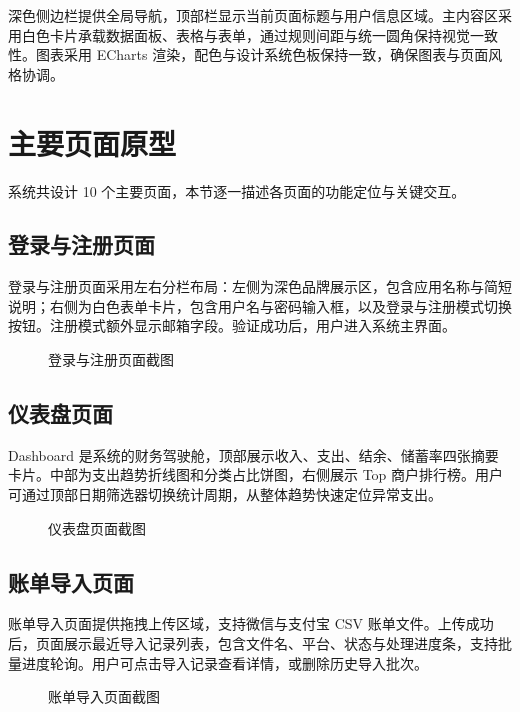 深色侧边栏提供全局导航，顶部栏显示当前页面标题与用户信息区域。主内容区采用白色卡片承载数据面板、表格与表单，通过规则间距与统一圆角保持视觉一致性。图表采用 ECharts 渲染，配色与设计系统色板保持一致，确保图表与页面风格协调。

\section{主要页面原型}

系统共设计 10 个主要页面，本节逐一描述各页面的功能定位与关键交互。

\subsection{登录与注册页面}

登录与注册页面采用左右分栏布局：左侧为深色品牌展示区，包含应用名称与简短说明；右侧为白色表单卡片，包含用户名与密码输入框，以及登录与注册模式切换按钮。注册模式额外显示邮箱字段。验证成功后，用户进入系统主界面。

\begin{figure}[H]
  \centering
  \caption{登录与注册页面截图}
  \label{fig:screenshot-login}
\end{figure}

\subsection{仪表盘页面}

Dashboard 是系统的财务驾驶舱，顶部展示收入、支出、结余、储蓄率四张摘要卡片。中部为支出趋势折线图和分类占比饼图，右侧展示 Top 商户排行榜。用户可通过顶部日期筛选器切换统计周期，从整体趋势快速定位异常支出。

\begin{figure}[H]
  \centering
  \caption{仪表盘页面截图}
  \label{fig:screenshot-dashboard}
\end{figure}

\clearpage
\subsection{账单导入页面}

账单导入页面提供拖拽上传区域，支持微信与支付宝 CSV 账单文件。上传成功后，页面展示最近导入记录列表，包含文件名、平台、状态与处理进度条，支持批量进度轮询。用户可点击导入记录查看详情，或删除历史导入批次。

\begin{figure}[H]
  \centering
  \caption{账单导入页面截图}
  \label{fig:screenshot-import}
\end{figure}

